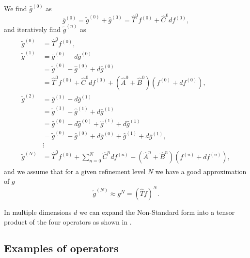\documentclass[../master_thesis.tex]{subfiles}
\begin{document}
We find $\bar{g}^{(0)}$ as
\begin{equation}
  \bar{g}^{(0)} =  \tilde{g}^{(0)} + \hat{g}^{(0)} = \hat{T}^{0}f^{(0)} + \hat{C}^{0}df^{(0)},
\end{equation}
and iteratively find $\tilde{g}^{(n)}$ as \cite{Frediani:2013}
\begin{align}
  \begin{split}
    \tilde{g}^{(0)} &= \hat{T}^{0}f^{(0)}, \\
    \tilde{g}^{(1)} &= \bar{g}^{(0)} + d\bar{g}^{(0)} \\
    &= \tilde{g}^{(0)} + \hat{g}^{(0)} + d\bar{g}^{(0)}\\
    &= \hat{T}^{0}f^{(0)} + \hat{C}^{0}df^{(0)} + \left(\hat{A}^{0} + \hat{B}^{0}\right)\left(f^{(0)} + df^{(0)}\right),\\
    \tilde{g}^{(2)} &= \bar{g}^{(1)} + d\bar{g}^{(1)}\\
    &= \tilde{g}^{(1)} + \hat{g}^{(1)} + d\bar{g}^{(1)} \\
    &= \bar{g}^{(0)} + d\bar{g}^{(0)} + \hat{g}^{(1)} + d\bar{g}^{(1)}\\
    &= \tilde{g}^{(0)} + \hat{g}^{(0)} + d\bar{g}^{(0)} + \hat{g}^{(1)} + d\bar{g}^{(1)},\\
    &\vdots\\
    \tilde{g}^{(N)} &= \hat{T}^{0}f^{(0)} + \sum^N_{n=0}\hat{C}^{n}df^{(n)} + \left(\hat{A}^{n} + \hat{B}^{n}\right)\left(f^{(n)}
    + df^{(n)}\right),
  \end{split}
\end{align}
and we assume that for a given refinement level $N$ we have a good approximation of
$g$
\begin{equation}
  \tilde{g}^{(N)} \approx g^{N} = (\hat{T}f)^N.
\end{equation}

In multiple dimensions $d$ we can expand the Non-Standard form into a tensor product of
the four operators as shown in \cite{Frediani:2013}.

\subsection{Examples of operators}
\end{document}
